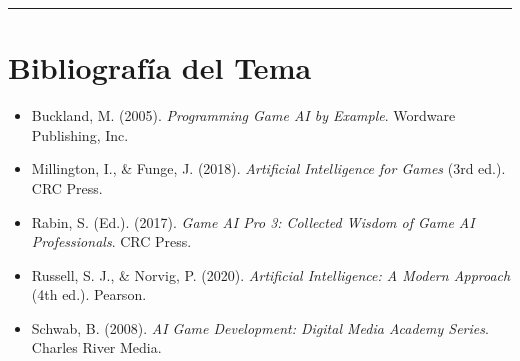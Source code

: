 \bigskip
\noindent\rule{\textwidth}{0.4pt} 

\section*{Bibliografía del Tema}

\begin{itemize}
    \item Buckland, M. (2005). \textit{Programming Game AI by Example}. Wordware Publishing, Inc.
    
    \item Millington, I., \& Funge, J. (2018). \textit{Artificial Intelligence for Games} (3rd ed.). CRC Press.
    
    \item Rabin, S. (Ed.). (2017). \textit{Game AI Pro 3: Collected Wisdom of Game AI Professionals}. CRC Press.
    
    \item Russell, S. J., \& Norvig, P. (2020). \textit{Artificial Intelligence: A Modern Approach} (4th ed.). Pearson.
    
    \item Schwab, B. (2008). \textit{AI Game Development: Digital Media Academy Series}. Charles River Media.
\end{itemize}
\newpage